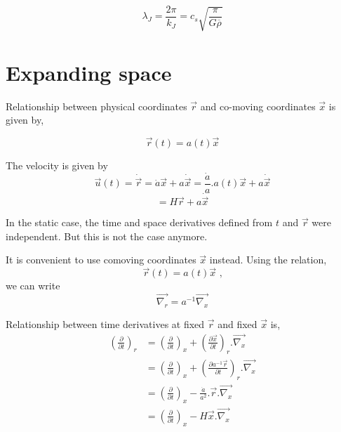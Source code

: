 \documentclass[a4,12pt,oneside]{report}
\begin{document}
	\begin{equation}
	\boxed{\lambda_J = \frac{2 \pi}{k_J} = c_s\sqrt{\frac{\pi}{G\overline{\rho}}}}
	\end{equation}
	
	
	\section{Expanding space}
	
	Relationship between physical coordinates $\vec{r}$ and co-moving coordinates $ \vec{x} $	is given by,
	
	\begin{equation}\label{key}
	\vec{r}(t) = a(t)\vec{x}
	\end{equation}
	
	The velocity is given by
	\begin{equation}\label{key}
	\vec{u}(t) = \dot{\vec{r}} = \dot{a}\vec{x} + a\dot{\vec{x}} = \frac{\dot{a}}{a}.a(t)\vec{x} + a\dot{\vec{x}}
	\end{equation}
	\begin{equation}\label{key}
	=H\vec{r} + a\dot{\vec{x}}
	\end{equation}
	
	In the static case, the time and space derivatives defined from $ t $ and $ \vec{r} $ were independent. But this is not the case anymore.
	
	It is convenient to use comoving coordinates $ \vec{x} $ instead.
	Using the relation, 
	\begin{equation}\label{key}
	\vec{r}(t)=a(t)\vec{x} \text{  ,}
	\end{equation}
	we can write 
	\begin{equation}\label{key}
	\overrightarrow{\nabla_r} = a^{-1}\overrightarrow{\nabla_x}
	\end{equation}
	
	Relationship between time derivatives at fixed $ \vec{r} $ and fixed $ \vec{x} $ is,
	\begin{align}\label{key}
	\left(\frac{\partial}{\partial t}\right)_r &= \left(\frac{\partial}{\partial t}\right)_x + \left(\frac{\partial \vec{x}}{\partial t}\right)_r.\overrightarrow{\nabla_x} \nonumber
	\\[12pt]
	&=\left(\frac{\partial}{\partial t}\right)_x+\left(\frac{\partial a^{-1}\vec{r}}{\partial t}\right)_r.\overrightarrow{\nabla_x} \nonumber
	\\
	&=\left(\frac{\partial}{\partial t}\right)_x - \frac{\dot{a}}{a^2}.\vec{r}.\overrightarrow{\nabla_x} \nonumber
	\\
	&=\left(\frac{\partial}{\partial t}\right)_x - H\vec{x}.\overrightarrow{\nabla_x}
	\end{align}
	
\end{document}
